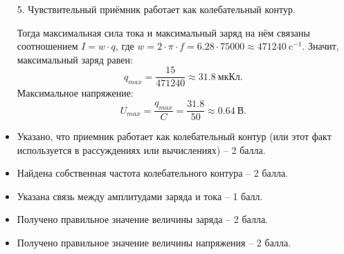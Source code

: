 \begin{enumerate}
    \item[5.] Чувствительный приёмник работает как 
    колебательный контур. 

    Тогда  максимальная сила тока и максимальный заряд на 
    нём связаны соотношением $I = w\cdot q$, где $w=2\cdot \pi\cdot f=6.28\cdot 75000\approx 471240 \: \text{c}^{-1}$.  Значит, максимальный заряд равен: 
    $$q_{max}=\frac{15}{471240}\approx 31.8 \: \text{мкКл}.$$
    Максимальное напряжение: 
    $$U_{max}=\frac{q_{max}}{C}=\frac{31.8}{50}\approx 0.64 \: \text{В}.$$
        
\end{enumerate}

\additionalCriteria

\begin{itemize}
    \item Указано, что приемник работает как колебательный контур (или этот факт используется в рассуждениях или вычислениях) – 2 балла.
    \item Найдена собственная частота колебательного контура – 2 балла.
    \item Указана связь между амплитудами заряда и тока – 1 балл.
    \item Получено правильное значение величины заряда – 2 балла.
    \item Получено правильное значение величины напряжения – 2 балла.  
\end{itemize}